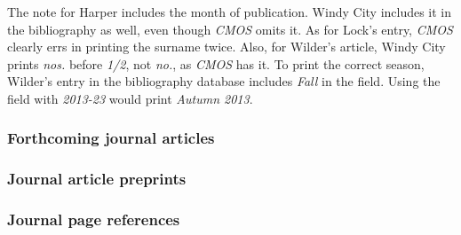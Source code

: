 \documentclass[11pt,letterpaper,oneside]{article}
\begin{document}
The note for Harper includes the month of publication. Windy City
includes it in the bibliography as well, even though \textit{CMOS}
omits it. As for Lock's entry, \textit{CMOS} clearly errs in printing
the surname twice. Also, for Wilder's article, Windy City prints
\textit{nos.} before \textit{1/2}, not \textit{no.}, as \textit{CMOS}
has it. To print the correct season, Wilder's entry in the
bibliography database includes \textit{Fall} in the 
field. Using the  field with \textit{2013-23} would
print \textit{Autumn 2013}.

\begin{citebib}
\item \cite[155]{lock2015}
\item \cite[651]{wesoky2015}
\item \cite[645]{harper2014}
\item \cite[60]{wilder2013}
\item \cite[52]{beattie1974}
\end{citebib}

\subsubsection{Forthcoming journal articles}
\label{14.172}

\begin{citebib}
\item \cite{authora}
\item \cite{jubb2015}
\end{citebib}

\subsubsection{Journal article preprints}
\label{14.173}

\begin{citebib}
\item \cite{huang2015}
\end{citebib}

\subsubsection{Journal page references}

\begin{citebib}
\item \cite{gold2015}
\item \cite[2--3]{paudyal2015}
\end{citebib}
\end{document}
